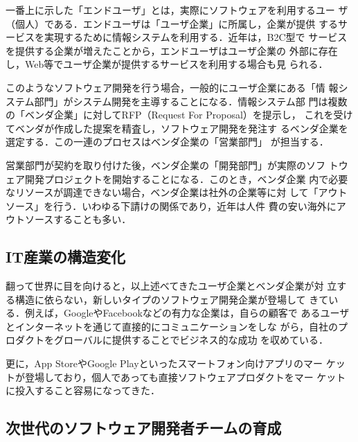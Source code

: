 \documentclass[a4j,9pt,twoside]{jarticle}
\begin{document}
\begin{multicols}{2}
    一番上に示した「エンドユーザ」とは，実際にソフトウェアを利用するユー
    ザ（個人）である．エンドユーザは「ユーザ企業」に所属し，企業が提供
    するサービスを実現するために情報システムを利用する．近年は，B2C型で
    サービスを提供する企業が増えたことから，エンドユーザはユーザ企業の
    外部に存在し，Web等でユーザ企業が提供するサービスを利用する場合も見
    られる．
    
    このようなソフトウェア開発を行う場合，一般的にユーザ企業にある「情
    報システム部門」がシステム開発を主導することになる．情報システム部
    門は複数の「ベンダ企業」に対してRFP（Request For Proposal）を提示し，
    これを受けてベンダが作成した提案を精査し，ソフトウェア開発を発注す
    るベンダ企業を選定する．この一連のプロセスはベンダ企業の「営業部門」
    が担当する．
    
    営業部門が契約を取り付けた後，ベンダ企業の「開発部門」が実際のソフ
    トウェア開発プロジェクトを開始することになる．このとき，ベンダ企業
    内で必要なリソースが調達できない場合，ベンダ企業は社外の企業等に対
    して「アウトソース」を行う．いわゆる下請けの関係であり，近年は人件
    費の安い海外にアウトソースすることも多い．
    
    \subsection{IT産業の構造変化}

    翻って世界に目を向けると，以上述べてきたユーザ企業とベンダ企業が対
    立する構造に依らない，新しいタイプのソフトウェア開発企業が登場して
    きている．例えば，GoogleやFacebookなどの有力な企業は，自らの顧客で
    あるユーザとインターネットを通じて直接的にコミュニケーションをしな
    がら，自社のプロダクトをグローバルに提供することでビジネス的な成功
    を収めている．
    
    更に，App StoreやGoogle Playといったスマートフォン向けアプリのマー
    ケットが登場しており，個人であっても直接ソフトウェアプロダクトをマー
    ケットに投入すること容易になってきた．
    
	\subsection{次世代のソフトウェア開発者チームの育成}


\end{multicols}
\end{document}
